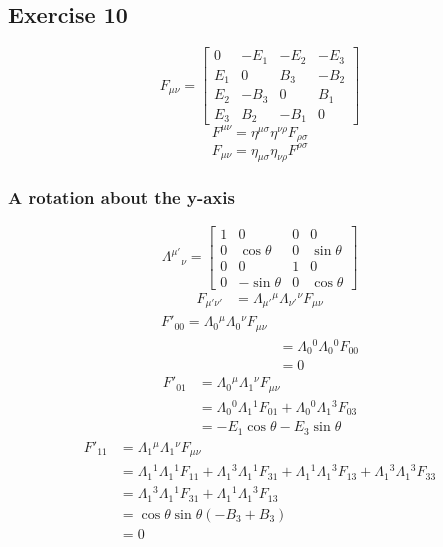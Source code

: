 \subsection{Exercise 10}
\begin{equation}
    F_{\mu\nu} = \begin{bmatrix}
        0 & -E_1 & -E_2 & -E_3 \\
        E_1 & 0 & B_3 & -B_2 \\
        E_2 & -B_3 & 0 & B_1 \\
        E_3 & B_2 & -B_1 & 0
    \end{bmatrix}
\end{equation}
\begin{equation}
    F^{\mu\nu}=\eta^{\mu\sigma}\eta^{\nu\rho} F_{\rho \sigma}
\end{equation}
\begin{equation}
    F_{\mu\nu} = \eta_{\mu\sigma} \eta_{\nu \rho} F^{\rho\sigma}
\end{equation}
\subsubsection{A rotation about the y-axis}
\begin{equation}
    \Lambda^{\mu'}{_\nu} = \begin{bmatrix}
        1 &0 &0 &0 \\
        0 & \cos\theta & 0 & \sin\theta \\
        0 & 0 & 1 &0 \\
        0 & -\sin\theta &0 & \cos\theta
    \end{bmatrix}
\end{equation}
\begin{align}
    F_{\mu'\nu'} &= \Lambda_{\mu'}{^\mu} \Lambda_{\nu'}{^\nu} F_{\mu\nu}
\end{align}
\begin{align}
    F'_{00} = \Lambda_0{^\mu}\Lambda_0{^\nu}F_{\mu\nu} \\
    &= \Lambda_0{^0} \Lambda_0{^0} F_{00} \\&= 0
\end{align}
\begin{align}
    F'_{01} &= \Lambda_0{^\mu}\Lambda_1{^\nu}F_{\mu\nu} \\
    &= \Lambda_0{^0}\Lambda_1{^1}F_{01} + \Lambda_0{^0}\Lambda_1{^3}F_{03}\\
    &= -E_1\cos{\theta} - E_3 \sin{\theta}
\end{align}
\begin{align}
    F'_{11} &= \Lambda_1{^\mu}\Lambda_1{^\nu}F_{\mu\nu} \\
    &= \Lambda_1{^1}\Lambda_1{^1}F_{11} +\Lambda_1{^3}\Lambda_1{^1}F_{31} + \Lambda_1{^1}\Lambda_1{^3}F_{13} + \Lambda_1{^3}\Lambda_1{^3}F_{33} \\
    &= \Lambda_1{^3}\Lambda_1{^1}F_{31} + \Lambda_1{^1}\Lambda_1{^3}F_{13}\\
    &= \cos{\theta}\sin{\theta} (-B_3 +B_3) \\
    &= 0
\end{align}

